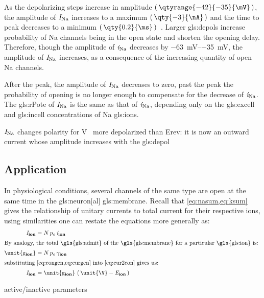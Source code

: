 \documentclass[class={myRUCProject}, crop=false]{standalone}
\begin{document}
As the depolarizing steps increase in amplitude \(\br{\qtyrange{-42}{-35}{\mV}}\), the amplitude of \(\mathit{I}_\mathrm{Na}\) increases to a maximum \(\br{\qty{-3}{\nA}}\) and the time to peak decreases to a minimum \(\br{\qty{0.2}{\ms}}\)~\cite{Hammond2015ch4}. 
Larger \glspl{gls:depol} increase probability of \gls{Na} channels being in the open state and shorten the opening delay. 
Therefore, though the amplitude of \(\mathit{i}_\mathrm{Na}\) decreases by \qtyrange{-63}{-35}{\mV}, the amplitude of \(\mathit{I}_\mathrm{Na}\) increases, as a consequence of the increasing quantity of open \gls{Na} channels. 

After the peak, the amplitude of \(\mathit{I}_\mathrm{Na}\) decreases to zero, past the peak the probability of opening is no longer enough to compensate for the decrease of \(\mathit{i}_\mathrm{Na}\). 
The \gls{gls:rPote} of \(\mathit{I}_\mathrm{Na}\) is the same as that of \(\mathit{i}_\mathrm{Na}\), depending only on the \gls{gls:excell} and \gls{gls:incell} concentrations of \gls{Na} \glspl{gls:ion}.

\(\mathit{I}_\mathrm{Na}\) changes polarity for \unit{\V\membrane} more depolarized than Erev: it is now an outward current whose amplitude increases with the \gls{gls:depol} 


\subsection{Application} 
In physiological conditions, several channels of the same type are open at the same time in the \gls{gls:neuron}[al] \gls{gls:membrane}. 
Recall that \cref{eq:nasum,eq:ksum} gives the relationship of unitary currents to total current for their respective ions, using similarities one can restate the equations 
more generally as:
\begin{align}
  \curr\ion&= N \, p_o \, \ucur\ion \label{eq:curgen}\\
\intertext{By analogy, the total \gls{gls:admit} of the \gls{gls:membrane} for a particular \gls{gls:ion} is: }
  \unit{\cond\ion} &= N \, p_o \, \ucon\ion \label{eq:congen}\\
\intertext{substituting \cref{eq:congen,eq:curgen} into \cref{eq:cur2con} gives us:}
  \curr\ion &= \unit{\cond\ion} \, \br{\unit{\V} - \equi\ion}\label{eq:ionCurrent}
\end{align}

active/inactive parameters
\end{document}
